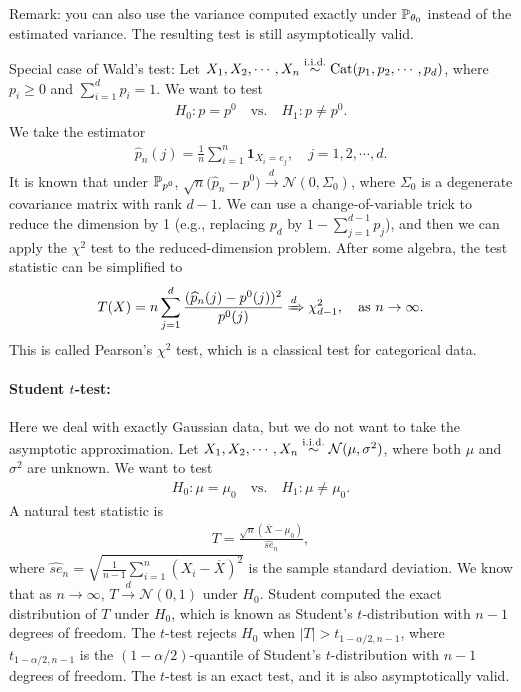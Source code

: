 \documentclass[11pt,letterpaper]{article}
\numberwithin{assumption}{lecture}
\numberwithin{theorem}{lecture}
\numberwithin{proposition}{lecture}
\numberwithin{lemma}{lecture}
\numberwithin{claim}{lecture}
\numberwithin{corollary}{lecture}
\numberwithin{definition}{lecture}
\numberwithin{conjecture}{lecture}
\numberwithin{remark}{lecture}
\numberwithin{example}{lecture}
\numberwithin{equation}{lecture}
\begin{document}
Remark: you can also use the variance computed exactly under ${\mathbb{P}}_{\theta_0}$ instead of the estimated variance. The resulting test is still asymptotically valid.

\bigskip

Special case of Wald's test: Let $X_1, X_2, \cdots, X_n \overset{\mathrm{i.i.d.}}{\sim} \mathrm{Cat} (p_1, p_2, \cdots, p_d)$, where $p_i \geq 0$ and $\sum_{i=1}^d p_i = 1$. We want to test
\begin{align*}
  H_0: p = p^0 \quad \text{vs.} \quad H_1: p \neq p^0.
\end{align*}
We take the estimator
\begin{align*}
  \widehat{p}_n (j) = \frac{1}{n} \sum_{i=1}^n \bm{1}_{X_i = e_j}, \quad j = 1,2, \cdots, d.
\end{align*}
It is known that under ${\mathbb{P}}_{p^0}$, $\sqrt{n} \big( \widehat{p}_n - p^0 \big) \xrightarrow{d} \mathcal{N} (0, \Sigma_0)$, where $\Sigma_0$ is a degenerate covariance matrix with rank $d - 1$. We can use a change-of-variable trick to reduce the dimension by 1 (e.g., replacing $p_d$ by $1 - \sum_{j=1}^{d-1} p_j$), and then we can apply the $\chi^2$ test to the reduced-dimension problem. After some algebra, the test statistic can be simplified to
\begin{align*}
  T (X) = n \sum_{j=1}^d \frac{(\widehat{p}_n (j) - p^0 (j))^2}{p^0 (j)} \xRightarrow{d} \chi^2_{d-1}, \quad \text{as } n \to \infty.
\end{align*}
This is called Pearson's $\chi^2$ test, which is a classical test for categorical data.

\paragraph{Student $t$-test:} Here we deal with exactly Gaussian data, but we do not want to take the asymptotic approximation. Let $X_1, X_2, \cdots, X_n \overset{\mathrm{i.i.d.}}{\sim} \mathcal{N} (\mu, \sigma^2)$, where both $\mu$ and $\sigma^2$ are unknown. We want to test
\begin{align*}
  H_0: \mu = \mu_0 \quad \text{vs.} \quad H_1: \mu \neq \mu_0.
\end{align*}
A natural test statistic is
\begin{align*}
  T = \frac{\sqrt{n} (\overline{X} - \mu_0)}{\widehat{se}_n},
\end{align*}
where $\widehat{se}_n = \sqrt{\frac{1}{n-1} \sum_{i=1}^n (X_i - \overline{X})^2}$ is the sample standard deviation. We know that as $n \to \infty$, $T \xrightarrow{d} \mathcal{N} (0, 1)$ under $H_0$. Student computed the exact distribution of $T$ under $H_0$, which is known as Student's $t$-distribution with $n - 1$ degrees of freedom. The $t$-test rejects $H_0$ when $|T| > t_{1 - \alpha/2, n - 1}$, where $t_{1 - \alpha/2, n - 1}$ is the $(1 - \alpha/2)$-quantile of Student's $t$-distribution with $n - 1$ degrees of freedom. The $t$-test is an exact test, and it is also asymptotically valid.
\end{document}
